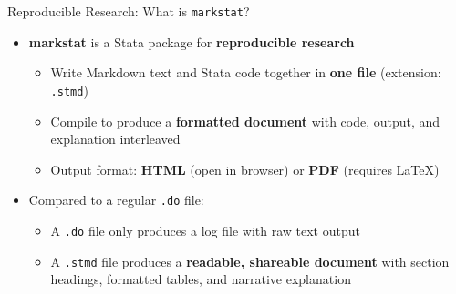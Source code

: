 \documentclass[dvipsnames,hyperref={pdfpagelabels=false}]{beamer}
\begin{document}
\begin{frame}{Reproducible Research: What is \texttt{markstat}?}

	\begin{itemize}
		\item \textbf{markstat} is a Stata package for \textbf{reproducible research}
		\vspace{0.3cm}
		\begin{itemize}
			\item Write Markdown text and Stata code together in \textbf{one file} (extension: \texttt{.stmd})
			\vspace{0.2cm}
			\item Compile to produce a \textbf{formatted document} with code, output, and explanation interleaved
			\vspace{0.2cm}
			\item Output format: \textbf{HTML} (open in browser) or \textbf{PDF} (requires \LaTeX)
		\end{itemize}
		\vspace{0.3cm}
		\item Compared to a regular \texttt{.do} file:
		\vspace{0.2cm}
		\begin{itemize}
			\item A \texttt{.do} file only produces a log file with raw text output
			\vspace{0.2cm}
			\item A \texttt{.stmd} file produces a \textbf{readable, shareable document} with section headings, formatted tables, and narrative explanation
		\end{itemize}
	\end{itemize}

\end{frame}
\end{document}
